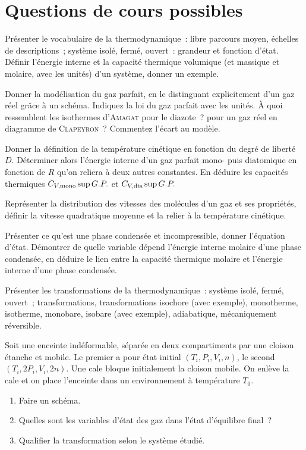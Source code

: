 \documentclass[a4paper, 11pt, final, garamond]{book}
\begin{document}
\newpage

\section{Questions de cours possibles}
\begin{enumerate}[label=\sqenumi]
	\litem{23pt}{\str}%
	Présenter le vocabulaire de la thermodynamique~: libre parcours moyen,
	échelles de descriptions~; système isolé, fermé, ouvert~: grandeur et
	fonction d'état. Définir l'énergie interne et la capacité thermique
	volumique (et massique et molaire, avec les unités) d'un système, donner un
	exemple.

	\litem{23pt}{\str}%
	Donner la modélisation du gaz parfait, en le distinguant
	explicitement d'un gaz réel grâce à un schéma. Indiquez la loi du gaz
	parfait avec les unités. À quoi ressemblent les isothermes d'\textsc{Amagat}
	pour le diazote~? pour un gaz réel en diagramme de \textsc{Clapeyron}~?
	Commentez l'écart au modèle.

	\litem{23pt}{\strr}%
	Donner la définition de la température cinétique en
	fonction du degré de liberté $D$. Déterminer alors l'énergie interne d'un
	gaz parfait mono- puis diatomique en fonction de $R$ qu'on reliera à deux
	autres constantes. En déduire les capacités thermiques $C_{V,\rm
				mono}\sup{G.P.}$ et $C_{V,\rm dia}\sup{G.P.}$

	\litem{23pt}{\str}%
	Représenter la distribution des vitesses des molécules d'un gaz et ses
	propriétés, définir la vitesse quadratique moyenne et la relier à la
	température cinétique.

	\litem{23pt}{\str}%
	Présenter ce qu'est une phase condensée et incompressible, donner
	l'équation d'état. Démontrer de quelle variable dépend l'énergie interne
	molaire d'une phase condensée, en déduire le lien entre la capacité
	thermique molaire et l'énergie interne d'une phase condensée.

	\litem{23pt}{\str}%
	Présenter les transformations de la thermodynamique~: système isolé,
	fermé, ouvert~; transformations, transformations isochore (avec exemple),
	monotherme, isotherme, monobare, isobare (avec exemple), adiabatique,
	mécaniquement réversible.

	\litem{23pt}{\strr}%
	Soit une enceinte indéformable, séparée en deux compartiments par une
	cloison étanche et mobile. Le premier a pour état initial $(T_i,P_i,V_i,n)$,
	le second $(T_i,2P_i,V_i,2n)$. Une cale bloque initialement la cloison
	mobile. On enlève la cale et on place l'enceinte dans un environnement à
	température $T_0$.
	\begin{enumerate}[label=\alph*)]
		\item Faire un schéma.
		\item Quelles sont les variables d'état des gaz dans l'état
		      d'équilibre final~?
		\item Qualifier la transformation selon le système étudié.
	\end{enumerate}


\end{enumerate}
\end{document}
